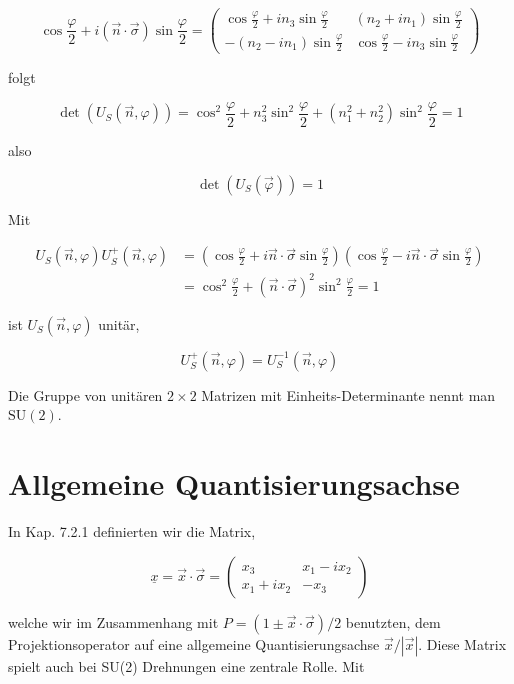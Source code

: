 \documentclass[10pt, letterpaper]{article}
\begin{document}
$$
\cos \frac{\varphi}{2}+i(\vec{n} \cdot \vec{\sigma}) \sin \frac{\varphi}{2}=\left(\begin{array}{cc}
\cos \frac{\varphi}{2}+i n_{3} \sin \frac{\varphi}{2} & \left(n_{2}+i n_{1}\right) \sin \frac{\varphi}{2} \\
-\left(n_{2}-i n_{1}\right) \sin \frac{\varphi}{2} & \cos \frac{\varphi}{2}-i n_{3} \sin \frac{\varphi}{2}
\end{array}\right)
$$

folgt

$$
\operatorname{det}\left(U_{S}(\vec{n}, \varphi)\right)=\cos ^{2} \frac{\varphi}{2}+n_{3}^{2} \sin ^{2} \frac{\varphi}{2}+\left(n_{1}^{2}+n_{2}^{2}\right) \sin ^{2} \frac{\varphi}{2}=1
$$

also

$$
\operatorname{det}\left(U_{S}(\vec{\varphi})\right)=1
$$

Mit

$$
\begin{aligned}
U_{S}(\vec{n}, \varphi) U_{S}^{+}(\vec{n}, \varphi) & =\left(\cos \frac{\varphi}{2}+i \vec{n} \cdot \vec{\sigma} \sin \frac{\varphi}{2}\right)\left(\cos \frac{\varphi}{2}-i \vec{n} \cdot \vec{\sigma} \sin \frac{\varphi}{2}\right) \\
& =\cos ^{2} \frac{\varphi}{2}+(\vec{n} \cdot \vec{\sigma})^{2} \sin ^{2} \frac{\varphi}{2}=1
\end{aligned}
$$

ist $U_{S}(\vec{n}, \varphi)$ unitär,

$$
U_{S}^{+}(\vec{n}, \varphi)=U_{S}^{-1}(\vec{n}, \varphi)
$$

Die Gruppe von unitären $2 \times 2$ Matrizen mit Einheits-Determinante nennt man $\mathrm{SU}(2)$.

\section*{Allgemeine Quantisierungsachse}
In Kap. 7.2.1 definierten wir die Matrix,

$$
\underline{x}=\vec{x} \cdot \vec{\sigma}=\left(\begin{array}{cc}
x_{3} & x_{1}-i x_{2} \\
x_{1}+i x_{2} & -x_{3}
\end{array}\right)
$$

welche wir im Zusammenhang mit $P=(1 \pm \vec{x} \cdot \vec{\sigma}) / 2$ benutzten, dem Projektionsoperator auf eine allgemeine Quantisierungsachse $\vec{x} /|\vec{x}|$. Diese Matrix spielt auch bei SU(2) Drehnungen eine zentrale Rolle. Mit
\end{document}
